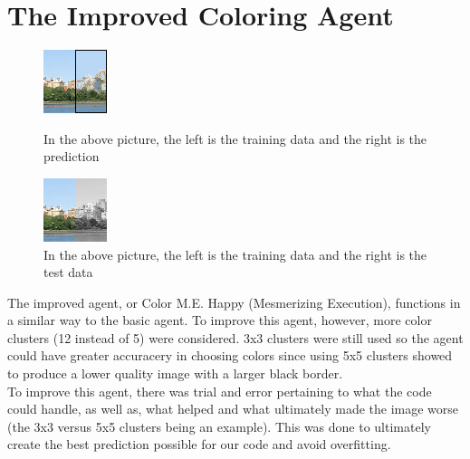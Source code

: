 \documentclass[12pt]{report}
\begin{document}
\section*{The Improved Coloring Agent}
\begin{figure}
\includegraphics[width=.5\textwidth]{Improved Agent Prediction}
\caption{In the above picture, the left is the training data and the right is the prediction}
\includegraphics[width=.5\textwidth]{Test Image}
\caption{In the above picture, the left is the training data and the right is the test data}
\end{figure}
The improved agent, or Color M.E. Happy (Mesmerizing Execution), functions in a similar way to the basic agent. To improve this agent, however, more color clusters (12 instead of 5) were considered. 3x3 clusters were still used so the agent could have greater accuracery in choosing colors since using 5x5 clusters showed to produce a lower quality image with a larger black border.\\
To improve this agent, there was trial and error pertaining to what the code could handle, as well as, what helped and what ultimately made the image worse (the 3x3 versus 5x5 clusters being an example). This was done to ultimately create the best prediction possible for our code and avoid overfitting.\\
\end{document}
